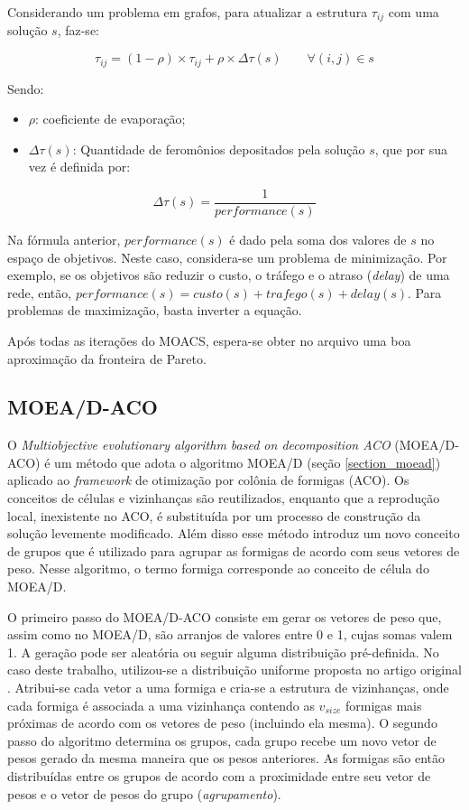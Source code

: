 Considerando um problema em grafos, para atualizar a estrutura $\tau_{ij}$ com uma solução $s$, faz-se:

\[\tau_{ij} = (1 - \rho) \times \tau_{ij} + \rho \times \Delta\tau(s) \qquad \forall(i,j) \in s\]

Sendo:
\begin{itemize} 
	\item $\rho$: coeficiente de evaporação;
	\item $\Delta\tau(s)$: Quantidade de feromônios depositados pela solução $s$, que por sua vez é definida por:
\end{itemize}

\[\Delta\tau(s) = \frac{1}{performance(s)}\]

Na fórmula anterior, $performance(s)$ é dado pela soma dos valores de $s$ no espaço de objetivos. Neste caso, considera-se um problema de minimização. Por exemplo, se os objetivos são reduzir o custo, o tráfego e o atraso (\textit{delay}) de uma rede, então, $performance(s) = custo(s) + trafego(s) + delay(s)$. Para problemas de maximização, basta inverter a equação.

Após todas as iterações do MOACS, espera-se obter no arquivo uma boa aproximação da fronteira de Pareto. 

\subsection{MOEA/D-ACO}
O \textit{Multiobjective evolutionary algorithm based on decomposition ACO} (MOEA/D-ACO) \cite{Ke2013} é um método que adota o algoritmo MOEA/D (seção \ref{section_moead}) aplicado ao \textit{framework} de otimização por colônia de formigas (ACO). Os conceitos de células e vizinhanças são reutilizados, enquanto que a reprodução local, inexistente no ACO, é substituída por um processo de construção da solução levemente modificado. Além disso esse método introduz um novo conceito de grupos que é utilizado para agrupar as formigas de acordo com seus vetores de peso. Nesse algoritmo, o termo formiga corresponde ao conceito de célula do MOEA/D.

O primeiro passo do MOEA/D-ACO consiste em gerar os vetores de peso que, assim como no MOEA/D, são arranjos de valores entre 0 e 1, cujas somas valem 1. A geração pode ser aleatória ou seguir alguma distribuição pré-definida. No caso deste trabalho, utilizou-se a distribuição uniforme proposta no artigo original \cite{Ke2013}. Atribui-se cada vetor a uma formiga e cria-se a estrutura de vizinhanças, onde cada formiga é associada a uma vizinhança contendo as $v_{size}$ formigas mais próximas de acordo com os vetores de peso (incluindo ela mesma). O segundo passo do algoritmo determina os grupos, cada grupo recebe um novo vetor de pesos gerado da mesma maneira que os pesos anteriores. As formigas são então distribuídas entre os grupos de acordo com a proximidade entre seu vetor de pesos e o vetor de pesos do grupo (\textit{agrupamento}).

